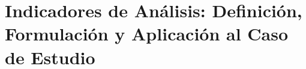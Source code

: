 

\section{Indicadores de Análisis: Definición, Formulación y Aplicación al
Caso de Estudio}
\label{sec:indicadores-formulas}












